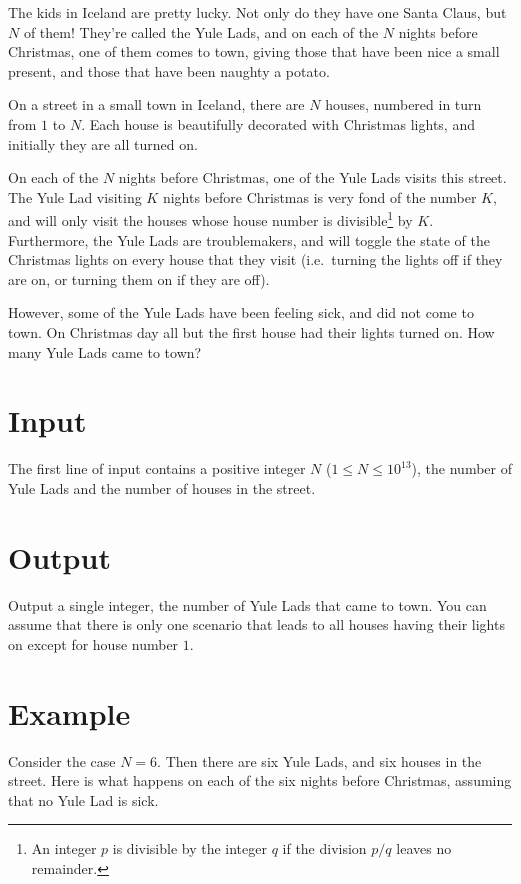 \def\version{1}

The kids in Iceland are pretty lucky. Not only do they have one Santa Claus,
but $N$ of them! They're called the Yule Lads, and on each of the $N$ nights
before Christmas, one of them comes to town, giving those that have been nice a
small present, and those that have been naughty a potato.

On a street in a small town in Iceland, there are $N$ houses, numbered
in turn from $1$ to $N$. Each house is beautifully decorated with
Christmas lights, and initially they are all turned on.

On each of the $N$ nights before Christmas, one of the Yule Lads visits this
street. The Yule Lad visiting $K$ nights before Christmas is very fond of the
number $K$, and will only visit the houses whose house number is
divisible\footnote{An integer $p$ is divisible by the integer $q$ if the
division $p/q$ leaves no remainder.} by $K$. Furthermore, the Yule Lads are
troublemakers, and will toggle the state of the Christmas lights on every house
that they visit (i.e.\ turning the lights off if they are on, or turning them
on if they are off).

However, some of the Yule Lads have been feeling sick, and did not come to
town. On Christmas day all but the first house had their lights turned on. How
many Yule Lads came to town?

\section*{Input}
The first line of input contains a positive integer $N$ ($1 \leq N \leq 10^{13}$), the number of Yule
Lads and the number of houses in the street.

\section*{Output}
Output a single integer, the number of Yule Lads that came to town. You can
assume that there is only one scenario that leads to all houses having their
lights on except for house number $1$.



\section*{Example}
Consider the case $N = 6$. Then there are six Yule Lads, and six houses in the
street. Here is what happens on each of the six nights before Christmas,
assuming that no Yule Lad is sick.


